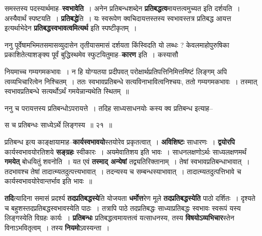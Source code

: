 \documentclass[article,12pt,a4paper]{memoir}
\begin{document}
	  \pstart समस्तस्य पदस्यार्थमाह--\textbf{स्वभावेति} । अनेन प्रतिबन्धशब्देन \textbf{प्रतिबद्धत्व}मायत्तत्वमुच्यत इति दर्शयति । अस्यैवार्थं स्पष्टयति । \textbf{प्रतिबद्धे}ति । यः स्वरूपेण क्वचिदायत्तस्तस्य स्वभावस्तत्र प्रतिबद्ध आयत्त इत्यर्थाभेदेन \textbf{प्रतिबद्धस्वभावत्वमित्यर्थ} इति स्पष्टीकृतम् ।
	\pend
      

	  \pstart ननु पूर्वेषामभिमतसमासव्युदासेन तृतीयासमासं दर्शयता किंस्विदति यो लब्धः ? केवलमाहोपुरुषिका प्रकाशितेत्याशङ्क्य पूर्वं बुद्धिस्थमेव स्फुटयितुमाह--\textbf{कारण} इति । कस्यासौ
	\pend
	  \bigskip
	  \begingroup
	

	  \pstart नियमाच्च गम्यगमकभावः । न हि योग्यतया प्रदीपवत् परोक्षार्थप्रतिपत्तिनिमित्तमिष्टं लिङ्गम् अपि त्वव्यभिचारित्वेन निश्चितम् । ततः स्वभावप्रतिबन्धे सत्यविनाभावित्वनिश्चयः, ततो गम्यगमकभावः । तस्मात् स्वभावप्रतिबन्धे सत्यर्थोऽर्थं गमयेन्नान्यथेति स्थितम् ॥
	\pend
        

	  \pstart ननु च परायत्तस्य प्रतिबन्धोऽपरायत्ते । तदिह साध्यसाधनयोः कस्य क्व प्रतिबन्ध इत्याह--
	\pend
      
	  \endgroup
	
	  \bigskip
	  \begingroup
	

	  \pstart स च प्रतिबन्धः साध्येऽर्थे लिङ्गस्य ॥ २१ ॥
	\pend
      
	  \endgroup
	

	  \pstart प्रतिबन्ध इत्य काङ्क्षायामाह--\textbf{कार्यस्वभावयो}स्तयोरेव प्रकृतत्वात् । \textbf{अविशिष्टः} साधारणः । \textbf{द्वयोरपि} कार्यस्वभावयोरतिशये \textbf{सङ्ग्रहः} स्वीकारः । अयमेवातिशय इति भावः । साधनलक्षणोऽर्थः साध्यलक्षणमर्थं \textbf{गमयेत्} बोधयितुं शवनोति । यत एवं \textbf{तस्माद् अन्येषां} तद्व्यतिरिक्तानाम् । तेषां स्वभावप्रतिबन्धाभावात् । तदभावश्च तेषां तादात्म्यतदुत्पत्त्यभावात् । तदन्यस्य च सम्बन्धस्याभावात् । तादात्म्यतदुत्पत्तिभावे च कार्यस्वभावयोरेवान्तर्भाव इति भावः ॥
	\pend
      

	  \pstart \textbf{तदि}त्यादिना समासं प्रदर्श्य \textbf{तदप्रतिबद्धस्ये}ति योजयता \textbf{धर्मोत्त}रेण मूले \textbf{तदप्रतिबद्धस्येति} पाठो दर्शितः । दृश्यते च बहुशस्तदप्रतिबद्धस्वभावस्येति पाठः । तत्रापि पाठे तदप्रतिबद्धः साध्याप्रतिबद्धः स्वभावः स्वरूपं यस्य लिङ्गस्येति विग्रहः कार्यः । \textbf{प्रतिबन्धः} प्रतिबद्धत्वमायत्तत्वं यत्साधनस्य, तस्य \textbf{विषयोऽव्यभिचार}स्तेन विनाऽभवितृत्वम् । तस्य \textbf{नियमो}ऽवस्यन्ता ।
	\pend
      
\end{document}

